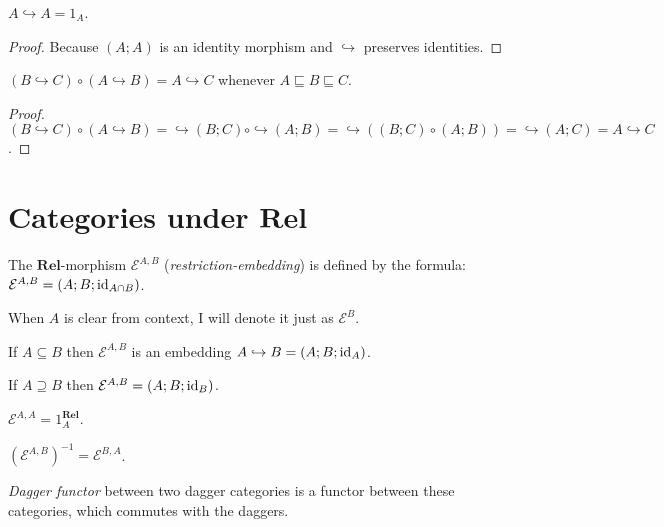 \begin{prop}
  $A \hookrightarrow A = 1_A$.
\end{prop}

\begin{proof}
  Because $(A ; A)$ is an identity morphism and $\hookrightarrow$ preserves
  identities.
\end{proof}

\begin{prop}
  $(B \hookrightarrow C) \circ (A \hookrightarrow B) = A \hookrightarrow C$
  whenever $A \sqsubseteq B \sqsubseteq C$.
\end{prop}

\begin{proof}
  $(B \hookrightarrow C) \circ (A \hookrightarrow B) = \hookrightarrow (B ; C)
  \circ \hookrightarrow (A ; B) = \hookrightarrow ((B ; C) \circ (A ; B)) =
  \hookrightarrow (A ; C) = A \hookrightarrow C$.
\end{proof}

\section{\texorpdfstring{Categories under $\mathbf{Rel}$}{Categories under Rel}}

\begin{defn}
  The $\mathbf{Rel}$-morphism $\mathcal{E}^{A,B}$
  (\emph{restriction-embedding}) is defined by the formula: $\mathcal{E}^{A,B}
  = (A ; B ; \operatorname{id}_{A \cap B})$.
  
  When $A$ is clear from context, I will denote it just as $\mathcal{E}^B$.
\end{defn}

\begin{obvious}
If $A \subseteq B$ then $\mathcal{E}^{A,B}$ is an embedding $A \hookrightarrow B
= (A ; B ; \operatorname{id}_A)$.
\end{obvious}

\begin{obvious}
If $A \supseteq B$ then $\mathcal{E}^{A,B} = (A ; B ;
\operatorname{id}_B)$.
\end{obvious}

\begin{obvious}
$\mathcal{E}^{A,A} = 1^{\mathbf{Rel}}_A$.
\end{obvious}

\begin{obvious}
$(\mathcal{E}^{A,B})^{- 1} = \mathcal{E}^{B,A}$.
\end{obvious}

\begin{defn}
\emph{Dagger functor} between two dagger categories is a functor between
these categories, which commutes with the daggers.
\end{defn}

